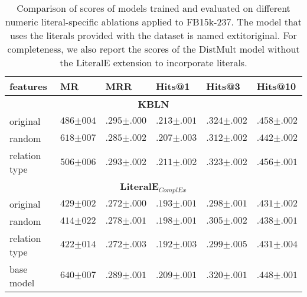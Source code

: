 
\begin{table}[]
\setlength{\tabcolsep}{6pt}
\renewcommand{\arraystretch}{1.1}

\caption{Comparison of scores of models trained and evaluated on different numeric literal-specific ablations applied to FB15k-237. The model that uses the literals provided with the dataset is named 	extit{original}. For completeness, we also report the scores of the DistMult model without the LiteralE extension to incorporate literals.}
\label{tab:variations}
\begin{center}

\begin{tabular}{l|lllll}
\hline
\multicolumn{1}{l|}{\textbf{features}} & \textbf{MR} & \textbf{MRR} & \textbf{Hits@1} & \textbf{Hits@3} & \textbf{Hits@10} \\
\hline \multicolumn{6}{c}{\textbf{KBLN}} \\ \hline 
original & $486{\scriptstyle \pm 004}$ & $.295{\scriptstyle \pm .000}$ & $.213{\scriptstyle \pm .001}$ & $.324{\scriptstyle \pm .002}$ & $.458{\scriptstyle \pm .002}$ \\ 
random & $618{\scriptstyle \pm 007}$ & $.285{\scriptstyle \pm .002}$ & $.207{\scriptstyle \pm .003}$ & $.312{\scriptstyle \pm .002}$ & $.442{\scriptstyle \pm .002}$ \\ 
relation type & $506{\scriptstyle \pm 006}$ & $.293{\scriptstyle \pm .002}$ & $.211{\scriptstyle \pm .002}$ & $.323{\scriptstyle \pm .002}$ & $.456{\scriptstyle \pm .001}$ \\ 
\hline \multicolumn{6}{c}{\textbf{LiteralE$_{ComplEx}$}} \\ \hline 
original & $429{\scriptstyle \pm 002}$ & $.272{\scriptstyle \pm .000}$ & $.193{\scriptstyle \pm .001}$ & $.298{\scriptstyle \pm .001}$ & $.431{\scriptstyle \pm .002}$ \\ 
random & $414{\scriptstyle \pm 022}$ & $.278{\scriptstyle \pm .001}$ & $.198{\scriptstyle \pm .001}$ & $.305{\scriptstyle \pm .002}$ & $.438{\scriptstyle \pm .001}$ \\ 
relation type & $422{\scriptstyle \pm 014}$ & $.272{\scriptstyle \pm .003}$ & $.192{\scriptstyle \pm .003}$ & $.299{\scriptstyle \pm .005}$ & $.431{\scriptstyle \pm .004}$ \\ 
base model & $640{\scriptstyle \pm 007}$ & $.289{\scriptstyle \pm .001}$ & $.209{\scriptstyle \pm .001}$ & $.320{\scriptstyle \pm .001}$ & $.448{\scriptstyle \pm .001}$ \\ 

\hline
\end{tabular}
\end{center}
\end{table}
